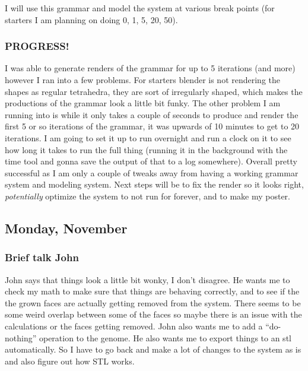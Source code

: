 \documentclass[letterpaper,oneside,titlepage]{article}
\begin{document}
I will use this grammar and model the system at various break points (for starters I am planning on doing 0, 1, 5, 20, 50).

\subsubsection{PROGRESS!}
I was able to generate renders of the grammar for up to 5 iterations (and more) however I ran into a few problems.  For starters blender is not rendering the shapes as regular tetrahedra, they are sort of irregularly shaped, which makes the productions of the grammar look a little bit funky.  The other problem I am running into is while it only takes a couple of seconds to produce and render the first 5 or so iterations of the grammar, it was upwards of 10 minutes to get to 20 iterations.  I am going to set it up to run overnight and run a clock on it to see how long it takes to run the full thing (running it in the background with the time tool and gonna save the output of that to a log somewhere).  Overall pretty successful as I am only a couple of tweaks away from having a working grammar system and modeling system.  Next steps will be to fix the render so it looks right, \emph{potentially} optimize the system to not run for forever, and to make my poster.


\subsection{Monday, November }

\subsubsection{Brief talk John}
John says that things look a little bit wonky, I don't disagree.  He wants me to check my math to make sure that things are behaving correctly, and to see if the the grown faces are actually getting removed from the system.  There seems to be some weird overlap between some of the faces so maybe there is an issue with the calculations or the faces getting removed.  John also wants me to add a ``do-nothing'' operation to the genome.  He also wants me to export things to an stl automatically.  So I have to go back and make a lot of changes to the system as is and also figure out how STL works.
\end{document}
